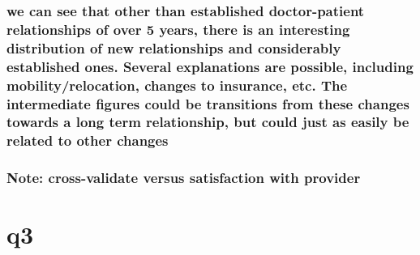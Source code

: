 \documentclass[11pt]{article}
\begin{document}
    \hypertarget{we-can-see-that-other-than-established-doctor-patient-relationships-of-over-5-years-there-is-an-interesting-distribution-of-new-relationships-and-considerably-established-ones.-several-explanations-are-possible-including-mobilityrelocation-changes-to-insurance-etc.-the-intermediate-figures-could-be-transitions-from-these-changes-towards-a-long-term-relationship-but-could-just-as-easily-be-related-to-other-changes}{%
\subsubsection{we can see that other than established doctor-patient
relationships of over 5 years, there is an interesting distribution of
new relationships and considerably established ones. Several
explanations are possible, including mobility/relocation, changes to
insurance, etc. The intermediate figures could be transitions from these
changes towards a long term relationship, but could just as easily be
related to other
changes}\label{we-can-see-that-other-than-established-doctor-patient-relationships-of-over-5-years-there-is-an-interesting-distribution-of-new-relationships-and-considerably-established-ones.-several-explanations-are-possible-including-mobilityrelocation-changes-to-insurance-etc.-the-intermediate-figures-could-be-transitions-from-these-changes-towards-a-long-term-relationship-but-could-just-as-easily-be-related-to-other-changes}}

    \hypertarget{note-cross-validate-versus-satisfaction-with-provider}{%
\subsubsection{Note: cross-validate versus satisfaction with
provider}\label{note-cross-validate-versus-satisfaction-with-provider}}

    \hypertarget{q3}{%
\section{q3}\label{q3}}
\end{document}
